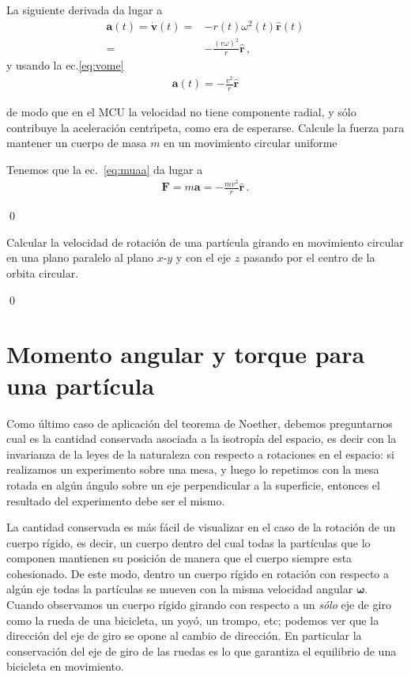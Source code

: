 La siguiente derivada da lugar a 
\begin{align*}
  \mathbf{a}(t)=\dot{\mathbf{v}}(t)=&-r(t)\omega^2(t)\hat{\mathbf{r}}(t)\nonumber\\
  =&-\frac{(r\omega)^2}{r}\hat{\mathbf{r}}\,,
\end{align*}
y usando la ec.\eqref{eq:vome}
\begin{align}
\label{eq:muaa}
  \mathbf{a}(t)=-\frac{v^2}{r}\hat{\mathbf{r}}
\end{align}

de modo que en el MCU la velocidad no tiene componente radial, y s\'olo
contribuye la aceleraci\'on centr\'\i peta, como era de esperarse.
Calcule la fuerza para mantener un cuerpo de masa $m$ en un movimiento circular uniforme


Tenemos que la ec.~\eqref{eq:muaa} da lugar a
\begin{align}
  \mathbf{F}=m\mathbf{a}=-\frac{m v^2}{r}\hat{\mathbf{r}}\,.
\end{align}


\qed



\ejemplo{} 
\label{eje:movim-gener-en}
Calcular la velocidad de rotación de una partícula 
girando en movimiento circular en una plano paralelo al plano $x$-$y$
y con el eje $z$ pasando por el centro de la orbita circular.

\qed


\section{Momento angular y torque para una partícula}
Como último caso de aplicación del teorema de Noether, debemos
preguntarnos cual es la cantidad conservada asociada a la isotropía
del espacio, es decir con la invarianza de la leyes de la naturaleza
con respecto a rotaciones en el espacio: si realizamos un experimento
sobre una mesa, y luego lo repetimos con la mesa rotada en algún
ángulo sobre un eje perpendicular a la superficie, entonces el resultado
del experimento debe ser el mismo.

La cantidad conservada es más fácil de visualizar en el caso de la
rotación de un cuerpo rígido, es decir, un cuerpo dentro del cual
todas la partículas que lo componen mantienen su posición de manera
que el cuerpo siempre esta cohesionado. 
De este modo, dentro un cuerpo rígido en rotación con respecto a algún
eje todas la partículas se mueven con la misma velocidad angular
$\boldsymbol{\omega}$.
Cuando observamos un cuerpo rígido girando con respecto a un
\emph{sólo} eje de giro como la rueda de una bicicleta, un yoyó, un
trompo, etc; podemos ver que la dirección del eje de giro se opone al
cambio de dirección. 
En particular la conservación del eje de giro de las ruedas es lo que
garantiza el equilibrio de una bicicleta en movimiento.


